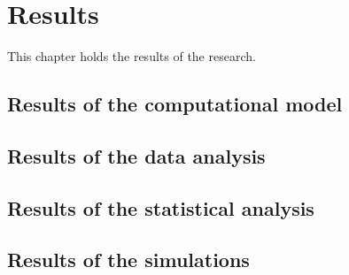 \chapter{Results}

This chapter holds the results of the research.

\section{Results of the computational model}

\section{Results of the data analysis}

\section{Results of the statistical analysis}

\section{Results of the simulations}

